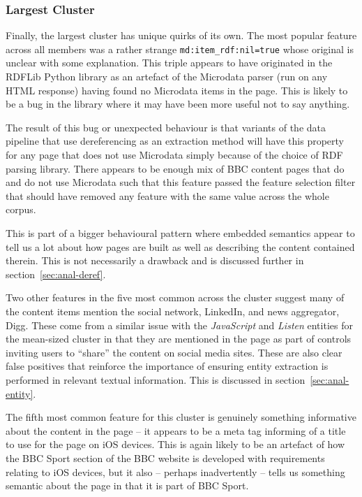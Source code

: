 \subsubsection{Largest Cluster}

Finally, the largest cluster has unique quirks of its own. The most
popular feature across all members was a rather strange
\texttt{md:item\_rdf:nil=true} whose original is unclear with some
explanation. This triple appears to have originated in the RDFLib
Python library as an artefact of the Microdata parser (run on any
HTML response) having found no Microdata items in the page. This is
likely to be a bug in the library where it may have been more useful
not to say anything.

The result of this bug or unexpected behaviour is that variants
of the data pipeline that use dereferencing as an extraction method will
have this property for any page that does not use Microdata simply
because of the choice of RDF parsing library. There appears to be
enough mix of BBC content pages that do and do not use Microdata such
that this feature passed the feature selection filter that should
have removed any feature with the same value across the whole corpus.

This is part of a bigger behavioural pattern where embedded semantics
appear to tell us a lot about how pages are built as well as
describing the content contained therein. This is not necessarily a
drawback and is discussed further in section~\ref{sec:anal-deref}.

Two other features in the five most common across the cluster suggest
many of the content items mention the social network, LinkedIn, and
news aggregator, Digg. These come from a similar issue with the
\emph{JavaScript} and \emph{Listen} entities for the mean-sized
cluster in that they are mentioned in the page as part of controls
inviting users to ``share'' the content on social media sites. These
are also clear false positives that reinforce the importance of
ensuring entity extraction is performed in relevant textual
information. This is discussed in section~\ref{sec:anal-entity}.

The fifth most common feature for this cluster is genuinely something
informative about the content in the page -- it appears to be a meta
tag informing of a title to use for the page on iOS devices. This is
again likely to be an artefact of how the BBC Sport section of the
BBC website is developed with requirements relating to iOS devices,
but it also -- perhaps inadvertently -- tells us something semantic
about the page in that it is part of BBC Sport.

